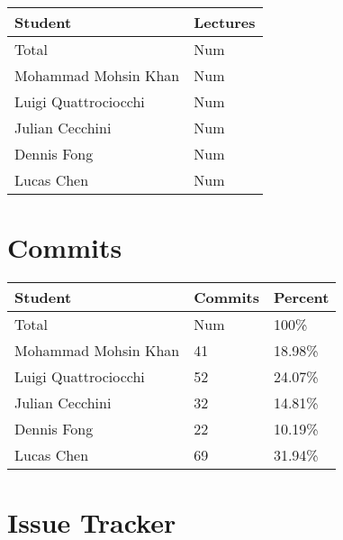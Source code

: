 \documentclass{article}
\begin{document}
\begin{table}[H]
\centering
\begin{tabular}{ll}
\toprule
\textbf{Student} & \textbf{Lectures}\\
\midrule
Total & Num\\
Mohammad Mohsin Khan & Num\\
Luigi Quattrociocchi & Num\\
Julian Cecchini & Num\\
Dennis Fong & Num\\
Lucas Chen & Num\\
\bottomrule
\end{tabular}
\end{table}


\section{Commits}


\begin{table}[H]
\centering
\begin{tabular}{lll}
\toprule
\textbf{Student} & \textbf{Commits} & \textbf{Percent}\\
\midrule
Total & Num & 100\% \\
Mohammad Mohsin Khan & 41 & 18.98\% \\
Luigi Quattrociocchi & 52 & 24.07\% \\
Julian Cecchini & 32 & 14.81\% \\
Dennis Fong & 22 & 10.19\% \\
Lucas Chen & 69 & 31.94\% \\
\bottomrule
\end{tabular}
\end{table}


\section{Issue Tracker}
\end{document}
